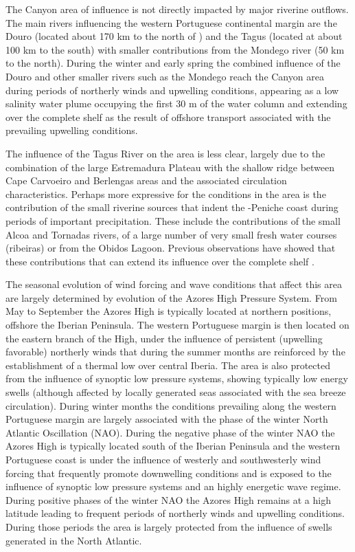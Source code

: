 The \naz Canyon area of influence is not directly impacted by major
riverine outflows. The main rivers influencing the western Portuguese
continental margin are the Douro (located about 170 km to the north of
\naze) and the Tagus (located at about 100 km to the south) with
smaller contributions from the Mondego river (50 km to the
north). During the winter and early spring the combined influence of
the Douro and other smaller rivers such as the Mondego reach the \naz
Canyon area during periods of northerly winds and upwelling
conditions, appearing as a low salinity water plume occupying the
first 30 m of the water column and extending over the complete shelf
as the result of offshore transport associated with the prevailing
upwelling conditions.

The influence of the Tagus River on the area is less clear, largely
due to the combination of the large Estremadura Plateau with the
shallow ridge between Cape Carvoeiro and Berlengas areas and the
associated circulation characteristics. Perhaps more expressive for
the conditions in the area is the contribution of the small riverine
sources that indent the \naze-Peniche coast during periods of
important precipitation. These include the contributions of the small
Alcoa and Tornadas rivers, of a large number of very small fresh water
courses (ribeiras) or from the Obidos Lagoon. Previous observations
have showed  that these contributions  that can extend its influence
over the complete shelf .

The seasonal evolution of wind forcing and wave conditions that affect
this area are largely determined by evolution of the Azores High
Pressure System. From May to September the Azores High is typically
located at northern positions, offshore the Iberian Peninsula. The
western Portuguese margin is then located on the eastern branch of the
High, under the influence of persistent (upwelling favorable)
northerly winds that during the summer months are reinforced by the
establishment of a thermal low over central Iberia. The area is also
protected from the influence of synoptic low pressure systems, showing
typically low energy swells (although affected by locally generated
seas associated with the sea breeze circulation). During winter months
the conditions prevailing along the western Portuguese margin are
largely associated with the phase of the winter North Atlantic
Oscillation (NAO). During the negative phase of the winter NAO the
Azores High is typically located south of the Iberian Peninsula and
the western Portuguese coast is under the influence of westerly and
southwesterly wind forcing that frequently promote downwelling
conditions and is exposed to the influence of synoptic low pressure
systems and an highly energetic wave regime. During positive phases of
the winter NAO the Azores High remains at a high latitude leading to
frequent periods of northerly winds and upwelling conditions. During
those periods the area is largely protected from the influence of
swells generated in the North Atlantic.
 

